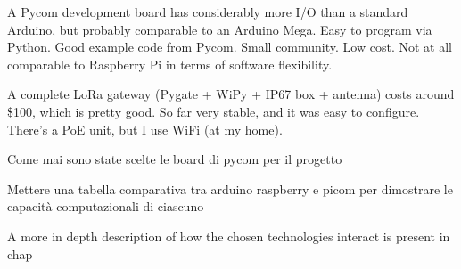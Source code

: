 		A Pycom development board has considerably more I/O than a standard Arduino, but probably comparable to an Arduino Mega. Easy to program via Python. Good example code from Pycom. Small community. Low cost. Not at all comparable to Raspberry Pi in terms of software flexibility.
		
		A complete LoRa gateway (Pygate + WiPy + IP67 box + antenna) costs around \$100, which is pretty good. So far very stable, and it was easy to configure. There's a PoE unit, but I use WiFi (at my home).

		Come mai sono state scelte le board di pycom per il progetto

		Mettere una tabella comparativa tra arduino raspberry e picom per dimostrare le capacità computazionali di ciascuno
		
		
		A more in depth description of how the chosen technologies interact is present in chap
